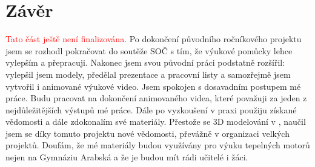 \section{Závěr}
\textcolor{red}{Tato část ještě není finalizována.}\odst
{Po dokončení původního ročníkového projektu jsem se rozhodl pokračovat do soutěže SOČ s tím, že výukové pomůcky lehce vylepším a přepracuji. Nakonec jsem svou původní práci podstatně rozšířil: vylepšil jsem modely, předělal prezentace a pracovní listy a samozřejmě jsem vytvořil i animované výukové video.}\odst
{Jsem spokojen s dosavadním postupem mé práce. Budu pracovat na dokončení animovaného videa, které považuji za jeden z nejdůležitějších výstupů mé práce. Dále po vyzkoušení v praxi použiju získané vědomosti a dále zdokonalím své materiály.}\odst
{Přestože se 3D modelování v , naučil jsem se díky tomuto projektu nové vědomosti, převážně v organizaci velkých projektů. Doufám, že mé materiály budou využívány pro výuku tepelných motorů nejen na Gymnáziu Arabská a že je budou mít rádi učitelé i žáci.}